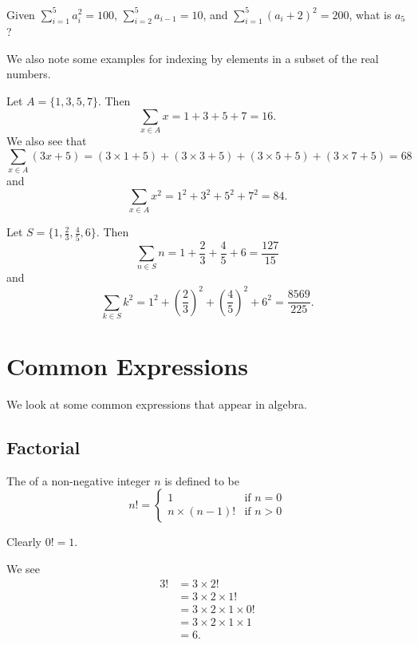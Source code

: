 \begin{exercise}
    Given $\displaystyle \sum_{i=1}^5a_i^2 = 100$, $\displaystyle \sum_{i=2}^5a_{i-1} = 10$, and $\displaystyle \sum_{i=1}^5(a_i+2)^2 = 200$, what is $a_5$?
\end{exercise}

We also note some examples for indexing by elements in a subset of the real numbers.
\begin{example}
    Let $A = \{1, 3, 5, 7\}$. Then
    \[
        \sum_{x \in A} x = 1 + 3 + 5 + 7 = 16.
    \]
    We also see that
    \[
        \sum_{x \in A}(3x + 5) = (3\times1 + 5) + (3\times3 + 5) + (3\times5 + 5) + (3\times7 + 5) = 68
    \]
    and
    \[
        \sum_{x\in A}x^2 = 1^2 + 3^2 + 5^2 + 7^2 = 84.
    \]
\end{example}

\begin{example}
    Let $S = \{1, \frac23, \frac45, 6\}$. Then
    \[
        \sum_{n \in S}n = 1 + \frac23 + \frac45 + 6 = \frac{127}{15}
    \]
    and
    \[
        \sum_{k \in S}k^2 = 1^2 + \left(\frac23\right)^2 + \left(\frac45\right)^2 + 6^2 = \frac{8569}{225}.
    \]
\end{example}



\section{Common Expressions}
We look at some common expressions that appear in algebra.

\subsection{Factorial}
\begin{definition}
    The  of a non-negative integer $n$ is defined to be
    \[
        n! = \begin{cases}
            1 & \text{if } n = 0\\
            n \times (n-1)! & \text{if } n > 0
        \end{cases}
    \]
\end{definition}

\begin{example}
    Clearly $0! = 1$.
\end{example}

\begin{example}
    We see
    \begin{align*}
        3! &= 3 \times 2!\\
        &= 3 \times 2 \times 1!\\
        &= 3 \times 2 \times 1 \times 0!\\
        &= 3 \times 2  \times 1  \times 1\\
        &= 6.
    \end{align*}
\end{example}

